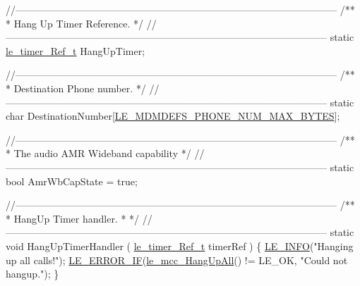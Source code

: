 \begin{DoxyCodeInclude}
\textcolor{comment}{//--------------------------------------------------------------------------------------------------}\textcolor{comment}{}
\textcolor{comment}{/**}
\textcolor{comment}{ * Hang Up Timer Reference.}
\textcolor{comment}{ */}
\textcolor{comment}{//--------------------------------------------------------------------------------------------------}
\textcolor{keyword}{static} \hyperlink{le__timer_8h_a763fa6992488cdce3b5a820817094838}{le\_timer\_Ref\_t} HangUpTimer;

\textcolor{comment}{//--------------------------------------------------------------------------------------------------}\textcolor{comment}{}
\textcolor{comment}{/**}
\textcolor{comment}{ * Destination Phone number.}
\textcolor{comment}{ */}
\textcolor{comment}{//--------------------------------------------------------------------------------------------------}
\textcolor{keyword}{static} \textcolor{keywordtype}{char}  DestinationNumber[\hyperlink{le__mdm_defs__interface_8h_ae6d4a4c7892f14d1e340f8df083d479f}{LE\_MDMDEFS\_PHONE\_NUM\_MAX\_BYTES}];

\textcolor{comment}{//--------------------------------------------------------------------------------------------------}\textcolor{comment}{}
\textcolor{comment}{/**}
\textcolor{comment}{ * The audio AMR Wideband capability}
\textcolor{comment}{ */}
\textcolor{comment}{//--------------------------------------------------------------------------------------------------}
\textcolor{keyword}{static} \textcolor{keywordtype}{bool} AmrWbCapState = \textcolor{keyword}{true};

\textcolor{comment}{//--------------------------------------------------------------------------------------------------}\textcolor{comment}{}
\textcolor{comment}{/**}
\textcolor{comment}{ * HangUp Timer handler.}
\textcolor{comment}{ *}
\textcolor{comment}{ */}
\textcolor{comment}{//--------------------------------------------------------------------------------------------------}
\textcolor{keyword}{static} \textcolor{keywordtype}{void} HangUpTimerHandler
(
    \hyperlink{le__timer_8h_a763fa6992488cdce3b5a820817094838}{le\_timer\_Ref\_t} timerRef
)
\{
    \hyperlink{le__log_8h_a23e6d206faa64f612045d688cdde5808}{LE\_INFO}(\textcolor{stringliteral}{"Hanging up all calls!"});
    \hyperlink{le__log_8h_aceaf11a11691d6c676e36dd317b38dbd}{LE\_ERROR\_IF}(\hyperlink{le__mcc__interface_8h_a38ac8543a579ecc81430c121a64bd346}{le\_mcc\_HangUpAll}() != LE\_OK, \textcolor{stringliteral}{"Could not hangup."});
\}


\end{DoxyCodeInclude}
